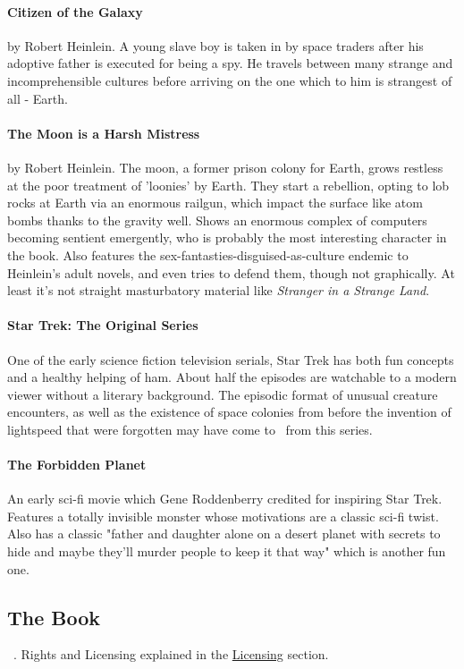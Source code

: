 \paragraph{Citizen of the Galaxy}
by Robert Heinlein. A young slave boy is taken in by space traders after his adoptive father is executed for being a spy. He travels between many strange and incomprehensible cultures before arriving on the one which to him is strangest of all - Earth.

\paragraph{The Moon is a Harsh Mistress}
by Robert Heinlein. The moon, a former prison colony for Earth, grows restless at the poor treatment of 'loonies' by Earth. They start a rebellion, opting to lob rocks at Earth via an enormous railgun, which impact the surface like atom bombs thanks to the gravity well. Shows an enormous complex of computers becoming sentient emergently, who is probably the most interesting character in the book. Also features the sex-fantasties-disguised-as-culture endemic to Heinlein's adult novels, and even tries to defend them, though not graphically. {\tiny At least it's not straight masturbatory material like \textit{Stranger in a Strange Land}.}

\paragraph{Star Trek: The Original Series}
One of the early science fiction television serials, Star Trek has both fun concepts and a healthy helping of ham. About half the episodes are watchable to a modern viewer without a literary background. The episodic format of unusual creature encounters, as well as the existence of space colonies from before the invention of lightspeed that were forgotten may have come to \getTitle\, from this series.

\paragraph{The Forbidden Planet}
An early sci-fi movie which Gene Roddenberry credited for inspiring Star Trek. Features a totally invisible monster whose motivations are a classic sci-fi twist. Also has a classic "father and daughter alone on a desert planet with secrets to hide and maybe they'll murder people to keep it that way" which is another fun one.

\subsection{The Book}
\par
{} \zandy\, . Rights and Licensing explained in the \hyperlink{Licensing}{Licensing} section. 

